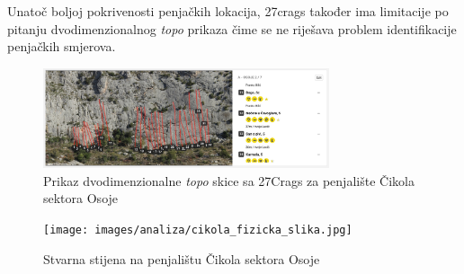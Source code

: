 Unatoč boljoj pokrivenosti penjačkih lokacija, 27crags također ima limitacije po pitanju dvodimenzionalnog \textit{topo} prikaza čime se ne riješava problem identifikacije penjačkih smjerova.

\begin{figure}[H]
    \centering
    \includegraphics[width=0.75\textwidth]{images/analiza/cikola_27crags_topo.jpeg}
    \caption{Prikaz dvodimenzionalne \textit{topo} skice sa 27Crags za penjalište Čikola sektora Osoje}
\end{figure}

\begin{figure}[H]
    \centering
    \texttt{[image: images/analiza/cikola\_fizicka\_slika.jpg]}
    \caption{Stvarna stijena na penjalištu Čikola sektora Osoje}
\end{figure} 